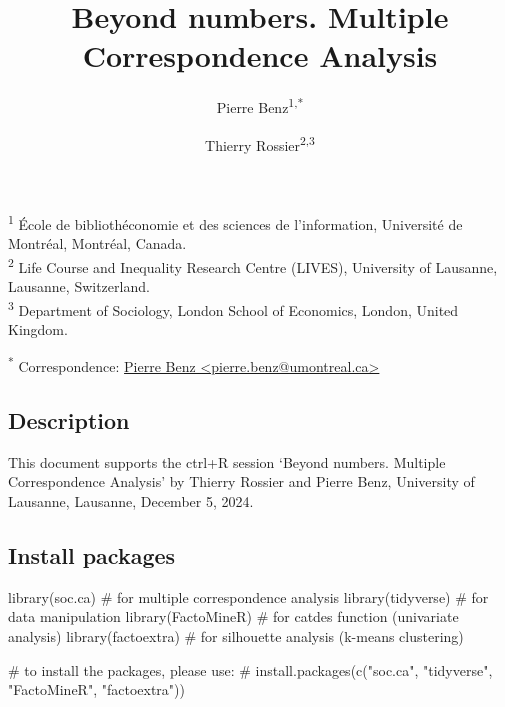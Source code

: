 \documentclass[
  letterpaper,
  DIV=11,
  numbers=noendperiod]{scrartcl}
\title{Beyond numbers. Multiple Correspondence Analysis}
\author{Pierre Benz\textsuperscript{1,*} \and Thierry
Rossier\textsuperscript{2,3}}
\date{}
\newenvironment{Shaded}{\begin{snugshade}}{\end{snugshade}}
\newcommand{\CommentTok}[1]{\textcolor[rgb]{0.37,0.37,0.37}{#1}}
\newcommand{\FunctionTok}[1]{\textcolor[rgb]{0.28,0.35,0.67}{#1}}
\newcommand{\NormalTok}[1]{\textcolor[rgb]{0.00,0.23,0.31}{#1}}
\begin{document}
\maketitle


\textsuperscript{1} École de bibliothéconomie et des sciences de
l'information, Université de Montréal, Montréal, Canada.\\
\textsuperscript{2} Life Course and Inequality Research Centre (LIVES),
University of Lausanne, Lausanne, Switzerland.\\
\textsuperscript{3} Department of Sociology, London School of Economics,
London, United Kingdom.

\textsuperscript{*} Correspondence:
\href{mailto:pierre.benz@umontreal.ca}{Pierre Benz
\textless{}pierre.benz@umontreal.ca\textgreater{}}

\normalsize

\normalsize

\subsection{Description}\label{description}

This document supports the ctrl+R session `Beyond numbers. Multiple
Correspondence Analysis' by Thierry Rossier and Pierre Benz, University
of Lausanne, Lausanne, December 5, 2024.

\subsection{Install packages}\label{install-packages}

\scriptsize

\begin{Shaded}
\begin{Highlighting}[]
\FunctionTok{library}\NormalTok{(soc.ca) }\CommentTok{\# for multiple correspondence analysis}
\FunctionTok{library}\NormalTok{(tidyverse) }\CommentTok{\# for data manipulation}
\FunctionTok{library}\NormalTok{(FactoMineR) }\CommentTok{\# for catdes function (univariate analysis)}
\FunctionTok{library}\NormalTok{(factoextra) }\CommentTok{\# for silhouette analysis (k{-}means clustering)}

\CommentTok{\# to install the packages, please use: }
\CommentTok{\# install.packages(c("soc.ca", "tidyverse", "FactoMineR", "factoextra"))}
\end{Highlighting}
\end{Shaded}

\normalsize
\end{document}
